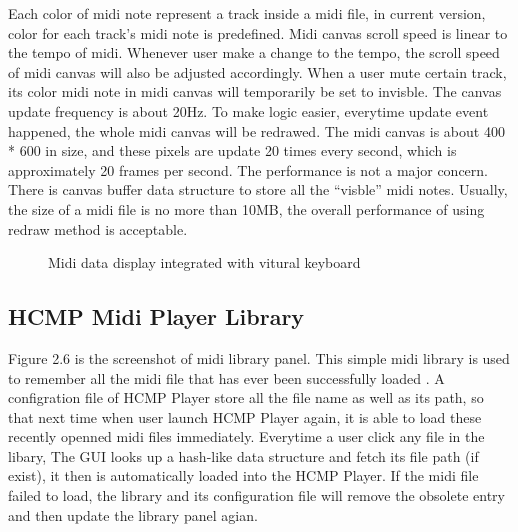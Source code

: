 Each color of midi note represent a track inside 
a midi file, in current version, color for each track's midi note is predefined. 
Midi canvas scroll speed is linear to the tempo of midi. Whenever user 
make a change to the tempo, the scroll speed of midi canvas will also be adjusted 
accordingly. When a user mute certain 
track, its color midi note in midi canvas will temporarily be set to invisble. 
The canvas
update frequency is about 20Hz. To make logic easier, everytime update event 
happened, the whole midi canvas will be redrawed. The midi canvas is about 400 * 600 
in size, and these pixels are update 20 times every second, which is approximately 
20 frames per second. The performance is not
a major concern. There is canvas buffer data 
structure to store all the ``visble'' midi notes. 
Usually, the size of a midi file is no more than 10MB, the overall performance of 
using redraw method is acceptable.

\begin{figure}[H]
\caption{Midi data display integrated with vitural keyboard}
\label{fig:speciation}
\end{figure}

\subsection{HCMP Midi Player Library}

Figure 2.6 is the screenshot of midi library panel. This simple midi library is 
used to remember all the midi file that has ever been successfully loaded . 
A configration file of HCMP Player store all the file name as well as its path, 
so that next time when user launch HCMP Player again, it is able to load these 
recently openned midi files immediately. Everytime a user click any file in the libary, 
The GUI looks up a hash-like data structure and fetch its file path (if exist),
it then is automatically
loaded into the HCMP Player. If the midi file failed to load, the library and its
configuration file will remove the obsolete entry and then update the library panel
agian.

